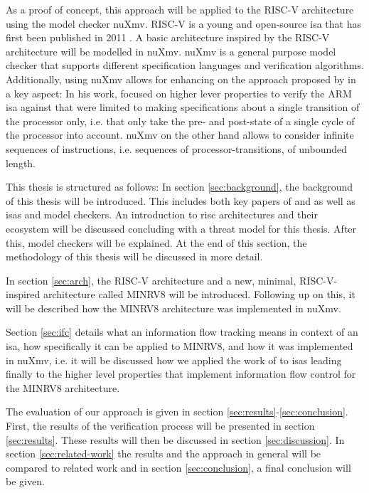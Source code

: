 As a proof of concept, this approach will be applied to the RISC-V architecture using the model checker nuXmv.
RISC-V is a young and open-source \gls{isa} that has first been published in 2011 \cite{RiscVISA-org}.
A basic architecture inspired by the RISC-V architecture will be modelled in nuXmv.
nuXmv is a general purpose model checker that supports different specification languages and verification algorithms.
Additionally, using nuXmv allows for enhancing on the approach proposed by \citeauthor{Reid17} in a key aspect:
In his work, \citeauthor{Reid17} focused on higher lever properties to verify the ARM \gls{isa} against that were limited to making specifications about a single transition of the processor only, i.e. that only take the pre- and post-state of a single cycle of the processor into account.
nuXmv on the other hand allows to consider infinite sequences of instructions, i.e. sequences of processor-transitions, of unbounded length.

This thesis is structured as follows:
In section \ref{sec:background}, the background of this thesis will be introduced.
This includes both key papers of \citeauthor{Reid17} and \citeauthor{Ferraiuolo17} as well as \glspl{isa} and model checkers.
An introduction to \gls{risc} architectures and their ecosystem will be discussed concluding with a threat model for this thesis.
After this, model checkers will be explained.
At the end of this section, the methodology of this thesis will be discussed in more detail.

In section \ref{sec:arch}, the RISC-V architecture and a new, minimal, RISC-V-inspired architecture called MINRV8 will be introduced.
Following up on this, it will be described how the MINRV8 architecture was implemented in nuXmv.

Section \ref{sec:ifc} details what an information flow tracking means in context of an \gls{isa}, how specifically it can be applied to MINRV8, and how it was implemented in nuXmv, i.e. it will be discussed how we applied the work of \citeauthor{Ferraiuolo17} \cite{Ferraiuolo17} to \glspl{isa} leading finally to the higher level properties that implement information flow control for the MINRV8 architecture.

The evaluation of our approach is given in section \ref{sec:results}-\ref{sec:conclusion}.
First, the results of the verification process will be presented in section \ref{sec:results}.
These results will then be discussed in section \ref{sec:discussion}.
In section \ref{sec:related-work} the results and the approach in general will be compared to related work and in section \ref{sec:conclusion}, a final conclusion will be given.

